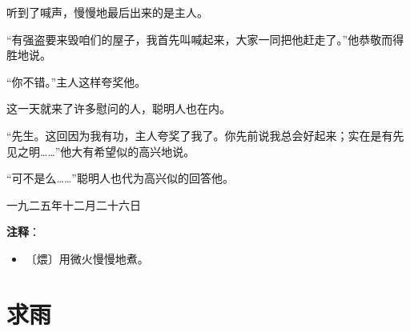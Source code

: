 \documentclass[12pt,UTF-8,openany]{ctexbook}
\begin{document}
\begin{normalsize}
    听到了喊声，慢慢地最后出来的是主人。
    
    “有强盗要来毁咱们的屋子，我首先叫喊起来，大家一同把他赶走了。”他恭敬而得胜地说。
    
    “你不错。”主人这样夸奖他。
    
    这一天就来了许多慰问的人，聪明人也在内。
    
    “先生。这回因为我有功，主人夸奖了我了。你先前说我总会好起来；实在是有先见之明……”他大有希望似的高兴地说。
    
    “可不是么……”聪明人也代为高兴似的回答他。
    
    \hfill 一九二五年十二月二十六日
    
\end{normalsize}


\newpage

\textbf{注释}：

\vspace{-1em}

\begin{itemize}
    \setlength\itemsep{-0.2em}
    \item 〔煨〕用微火慢慢地煮。
\end{itemize}

\chapter{求雨}
\end{document}
